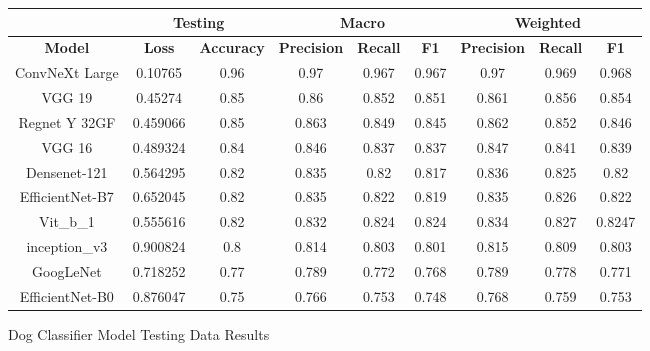 \documentclass{article}
\begin{document}
\begin{figure}[h]
\centering
\begin{tabular}{|c|cc|ccc|ccc|}
\hline
\multicolumn{1}{|l|}{} &
  \multicolumn{2}{c|}{Testing} &
  \multicolumn{3}{c|}{Macro} &
  \multicolumn{3}{c|}{Weighted} \\ \hline
\textbf{Model} &
  \multicolumn{1}{c|}{\textbf{Loss}} &
  \textbf{Accuracy} &
  \multicolumn{1}{c|}{\textbf{Precision}} &
  \multicolumn{1}{c|}{\textbf{Recall}} &
  \textbf{F1} &
  \multicolumn{1}{c|}{\textbf{Precision}} &
  \multicolumn{1}{c|}{\textbf{Recall}} &
  \textbf{F1} \\ \hline
ConvNeXt Large &
  \multicolumn{1}{c|}{0.10765} &
  0.96 &
  \multicolumn{1}{c|}{0.97} &
  \multicolumn{1}{c|}{0.967} &
  0.967 &
  \multicolumn{1}{c|}{0.97} &
  \multicolumn{1}{c|}{0.969} &
  0.968 \\ \hline
VGG 19 &
  \multicolumn{1}{c|}{0.45274} &
  0.85 &
  \multicolumn{1}{c|}{0.86} &
  \multicolumn{1}{c|}{0.852} &
  0.851 &
  \multicolumn{1}{c|}{0.861} &
  \multicolumn{1}{c|}{0.856} &
  0.854 \\ \hline
Regnet Y 32GF&
  \multicolumn{1}{c|}{0.459066} &
  0.85 &
  \multicolumn{1}{c|}{0.863} &
  \multicolumn{1}{c|}{0.849} &
  0.845 &
  \multicolumn{1}{c|}{0.862} &
  \multicolumn{1}{c|}{0.852} &
  0.846 \\ \hline
VGG 16 &
  \multicolumn{1}{c|}{0.489324} &
  0.84 &
  \multicolumn{1}{c|}{0.846} &
  \multicolumn{1}{c|}{0.837} &
  0.837 &
  \multicolumn{1}{c|}{0.847} &
  \multicolumn{1}{c|}{0.841} &
  0.839 \\ \hline
Densenet-121 &
  \multicolumn{1}{c|}{0.564295} &
  0.82 &
  \multicolumn{1}{c|}{0.835} &
  \multicolumn{1}{c|}{0.82} &
  0.817 &
  \multicolumn{1}{c|}{0.836} &
  \multicolumn{1}{c|}{0.825} &
  0.82 \\ \hline
EfficientNet-B7 &
  \multicolumn{1}{c|}{0.652045} &
  0.82 &
  \multicolumn{1}{c|}{0.835} &
  \multicolumn{1}{c|}{0.822} &
  0.819 &
  \multicolumn{1}{c|}{0.835} &
  \multicolumn{1}{c|}{0.826} &
  0.822 \\ \hline
Vit\_b\_1  &
  \multicolumn{1}{c|}{0.555616} &
  0.82 &
  \multicolumn{1}{c|}{0.832} &
  \multicolumn{1}{c|}{0.824} &
  0.824 &
  \multicolumn{1}{c|}{0.834} &
  \multicolumn{1}{c|}{0.827} &
  0.8247 \\ \hline
inception\_v3 &
  \multicolumn{1}{c|}{0.900824} &
  0.8 &
  \multicolumn{1}{c|}{0.814} &
  \multicolumn{1}{c|}{0.803} &
  0.801 &
  \multicolumn{1}{c|}{0.815} &
  \multicolumn{1}{c|}{0.809} &
  0.803 \\ \hline
GoogLeNet &
  \multicolumn{1}{c|}{0.718252} &
  0.77 &
  \multicolumn{1}{c|}{0.789} &
  \multicolumn{1}{c|}{0.772} &
  0.768 &
  \multicolumn{1}{c|}{0.789} &
  \multicolumn{1}{c|}{0.778} &
  0.771 \\ \hline
EfficientNet-B0 &
  \multicolumn{1}{c|}{0.876047} &
  0.75 &
  \multicolumn{1}{c|}{0.766} &
  \multicolumn{1}{c|}{0.753} &
  0.748 &
  \multicolumn{1}{c|}{0.768} &
  \multicolumn{1}{c|}{0.759} &
  0.753 \\ \hline
\end{tabular}
\caption{Dog Classifier Model Testing Data Results}
\label{fig:model2-test-further}
\end{figure}
\end{document}

